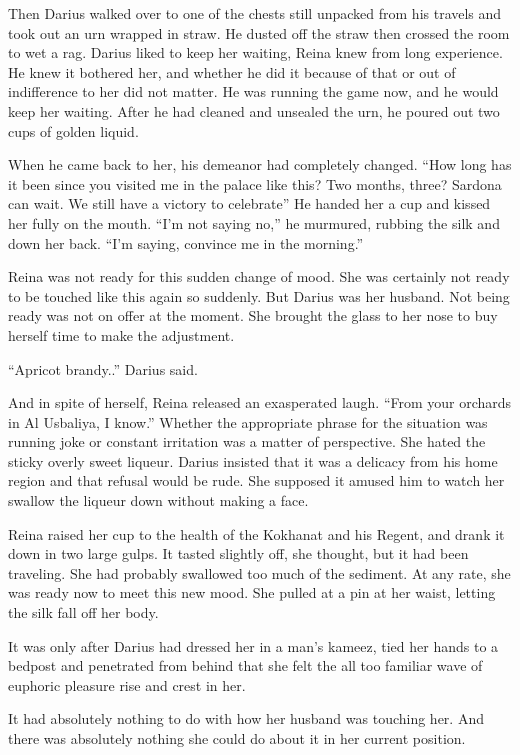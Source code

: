 \documentclass{article}
\begin{document}
	Then Darius walked over to one of the chests still unpacked from his travels and took out an urn wrapped in straw. He dusted off the straw then crossed the room to wet a rag. Darius liked to keep her waiting, Reina knew from long experience. He knew it bothered her, and whether he did it because of that or out of indifference to her did not matter. He was running the game now, and he would keep her waiting. After he had cleaned and unsealed the urn, he poured out two cups of golden liquid. 
	
	When he came back to her, his demeanor had completely changed. “How long has it been since you visited me in the palace like this? Two months, three? Sardona can wait. We still have a victory to celebrate” He handed her a cup and kissed her fully on the mouth. “I’m not saying no,” he murmured, rubbing the silk and down her back. “I’m saying, convince me in the morning.” 
	
	Reina was not ready for this sudden change of mood. She was certainly not ready to be touched like this again so suddenly. But Darius was her husband. Not being ready was not on offer at the moment. She brought the glass to her nose to buy herself time to make the adjustment.
	
	“Apricot brandy..” Darius said.
	
	And in spite of herself, Reina released an exasperated laugh. “From your orchards in Al Usbaliya, I know.” Whether the appropriate phrase for the situation was running joke or constant irritation was a matter of perspective. She hated the sticky overly sweet liqueur. Darius insisted that it was a delicacy from his home region and that refusal would be rude. She supposed it amused him to watch her swallow the liqueur down without making a face.
	
	Reina raised her cup to the health of the Kokhanat and his Regent, and drank it down in two large gulps. It tasted slightly off, she thought, but it had been traveling. She had probably swallowed too much of the sediment. At any rate, she was ready now to meet this new mood. She pulled at a pin at her waist, letting the silk  fall off her body. 
	
	It was only after Darius had dressed her in a man’s kameez, tied her hands to a bedpost and penetrated from behind that she felt the all too familiar wave of euphoric pleasure rise and crest in her. 
	
	It had absolutely nothing to do with how her husband was touching her. And there was absolutely nothing she could do about it in her current position.
	
\end{document}
